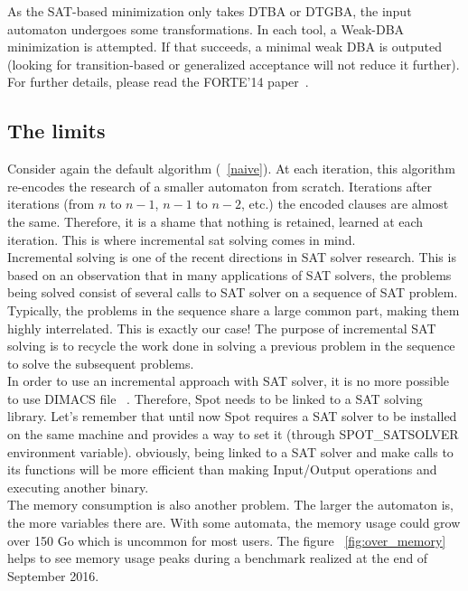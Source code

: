 \noindent As the SAT-based minimization only takes DTBA or DTGBA, the input automaton undergoes some
transformations. In each tool, a Weak-DBA minimization is attempted. If that succeeds, a minimal weak DBA
is outputed (looking for transition-based or generalized acceptance will not reduce it further). For
further details, please read the FORTE'14 paper~\cite{14}.

\subsection{The limits}
Consider again the default algorithm (~\ref{naive}).
At each iteration, this algorithm re-encodes the research of a smaller automaton from scratch. Iterations
after iterations (from $n$ to $n-1$, $n-1$ to $n-2$, etc.) the encoded clauses are almost the same.
Therefore, it is a shame that nothing is retained, learned at each iteration. This is where incremental sat
solving comes in mind.\\

Incremental solving is one of the recent directions in SAT solver research. This is
based on an observation that in many applications of SAT solvers, the problems being solved consist of
several calls to SAT solver on a sequence of SAT problem. Typically, the problems in the sequence share a
large common part, making them highly interrelated. This is exactly our case! The purpose of incremental
SAT solving is to recycle the work done in solving a previous problem in the sequence to solve the
subsequent problems.\\

In order to use an incremental approach with SAT solver, it is no more possible to use DIMACS file
~\cite{18}. Therefore, Spot needs to be linked to a SAT solving library. Let's remember that until now
Spot requires a SAT solver to be installed on the same machine and provides a way to set it (through
SPOT\_SATSOLVER environment variable). obviously, being linked to a SAT solver and make calls to its
functions will be more efficient than making Input/Output operations and executing another binary.\\

The memory consumption is also another problem. The larger the automaton is, the more variables there are.
With some automata, the memory usage could grow over 150 Go which is uncommon for most users. The figure
~\ref{fig:over_memory} helps to see memory usage peaks during a benchmark realized at the end of September
2016.\\

